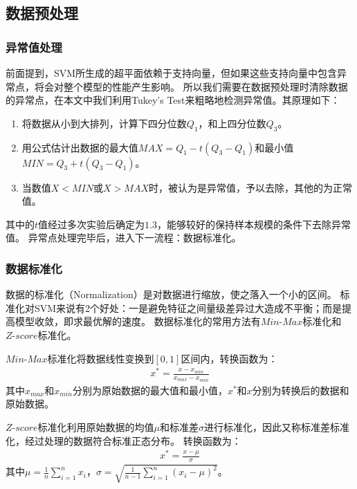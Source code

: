 \subsection{数据预处理}

\subsubsection{异常值处理}

前面提到，SVM所生成的超平面依赖于支持向量，但如果这些支持向量中包含异常点，将会对整个模型的性能产生影响。
所以我们需要在数据预处理时清除数据的异常点，在本文中我们利用Tukey's Test来粗略地检测异常值。其原理如下：
\begin{enumerate}
    \item 将数据从小到大排列，计算下四分位数$Q_1$，和上四分位数$Q_3$。
    \item 用公式估计出数据的最大值$MAX=Q_1-t(Q_3-Q_1)$和最小值$MIN=Q_3+t(Q_3-Q_1)$。
    \item 当数值$X<MIN$或$X>MAX$时，被认为是异常值，予以去除，其他的为正常值。
\end{enumerate}

其中的$t$值经过多次实验后确定为$1.3$，能够较好的保持样本规模的条件下去除异常值。
异常点处理完毕后，进入下一流程：数据标准化。

\subsubsection{数据标准化}

数据的标准化（Normalization）是对数据进行缩放，使之落入一个小的区间。
标准化对SVM来说有2个好处：一是避免特征之间量级差异过大造成不平衡；而是提高模型收敛，即求最优解的速度。
数据标准化的常用方法有$Min\text{-}Max$标准化和$Z\text{-}score$标准化。

$Min\text{-}Max$标准化将数据线性变换到$[0,1]$区间内，转换函数为：
\begin{align}
    x^*=\frac{x-x_{min}}{x_{max}-x_{min}}
\end{align}
其中$x_{max}$和$x_{min}$分别为原始数据的最大值和最小值，$x^*$和$x$分别为转换后的数据和原始数据。

$Z\text{-}score$标准化利用原始数据的均值$\mu$和标准差$\sigma$进行标准化，因此又称标准差标准化，经过处理的数据符合标准正态分布。
转换函数为：
\begin{align}
    x^*=\frac{x-\mu}{\sigma}
\end{align}
其中$\mu=\frac{1}{n}\sum_{i=1}^nx_i$，$\sigma=\sqrt{\frac{1}{n-1}\sum_{i=1}^n(x_i-\mu)^2}$。

